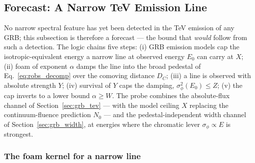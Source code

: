 \documentclass[aps,prd,onecolumn,amsmath,amssymb]{revtex4-2}
\begin{document}
\subsection{Forecast: A Narrow TeV Emission Line}
\label{sec:grb_tevline}

No narrow spectral feature has yet been detected in the TeV emission
of any GRB; this subsection is therefore a forecast --- the bound that
\emph{would} follow from such a detection.  The logic chains five
steps: (i) GRB emission models cap the isotropic-equivalent energy a
narrow line at observed energy $E_0$ can carry at $X$; (ii) foam of
exponent $\alpha$ damps the line into the broad pedestal of
Eq.~\eqref{eq:robs_decomp} over the comoving distance $D_C$; (iii) a
line is observed with absolute strength $Y$; (iv) survival of $Y$ caps
the damping, $\sigma_\phi^2(E_0)\le Z$; (v) the cap inverts to a lower
bound $\alpha\ge W$.  The probe combines the absolute-flux channel of
Section~\ref{sec:grb_tev} --- with the model ceiling $X$ replacing the
continuum-fluence prediction $N_0$ --- and the pedestal-independent
width channel of Section~\ref{sec:grb_width}, at energies where the
chromatic lever $\sigma_\phi\propto E$ is strongest.

\subsubsection{The foam kernel for a narrow line}
\label{sec:tevline_kernel}
\end{document}
